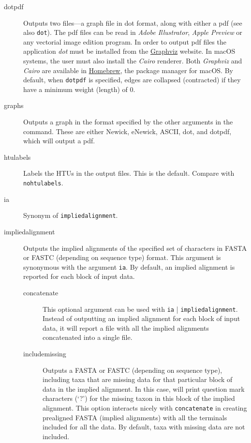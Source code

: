 \begin{description}
		\item[dotpdf] Outputs two files---a graph file in dot format, along with either
		a pdf (see also \texttt{dot}). The pdf files can be read in \textit{Adobe Illustrator}, 
		\textit{Apple Preview} or any vectorial image edition program. In order to output 
		pdf files the application \textit{dot} must be installed from the
		\href{https://graphviz.org/download/}{Graphviz} website. In macOS systems, the 
		user must also install the \textit{Cairo} renderer. Both \textit{Graphviz} and 
		\textit{Cairo} are available in \href{https://brew.sh/}{Homebrew}, the package 
		manager for macOS. By default, when \texttt{dotpdf} is specified,
		edges are collapsed (contracted) if they have a minimum weight (length) of 0.
		
		\item[graphs] Outputs a graph in the format specified by the other arguments 
		in the command. These are either Newick, eNewick, ASCII, dot, and dotpdf, 
		which will output a pdf.
		
		\item[htulabels] Labels the HTUs in the output files. This is the default. Compare 
		with \texttt{nohtulabels}.
		
		\item[ia] Synonym of \texttt{impliedalignment}.
		
		\item[impliedalignment] Outputs the implied alignments of the specified 
		set of characters in FASTA or FASTC (depending on sequence type) format. 
		This argument is synonymous with the argument \texttt{ia}. By default, 
		an implied alignment is reported for each block of input data. 
		
		\begin{description}
		
			\item[concatenate] This optional argument can be used with \texttt{ia}
			| \texttt{impliedalignment}. Instead of outputting an implied alignment 
			for each block of input data, it will report a file with all the implied 
			alignments concatenated into a single file.
			
			\item[includemissing] Outputs a FASTA or FASTC (depending on sequence 
			type), including taxa that are missing data for that particular block of data in 
			the implied alignment. In this case, \phyg will print question mark characters 
			(`?') for the missing taxon in this block of the implied alignment. This option 
			interacts nicely with \texttt{concatenate} in creating prealigned FASTA 
			(implied alignments) with all the terminals included for all the data. By default, 
			taxa with missing data are not included.
			

\end{description}
\end{description}
